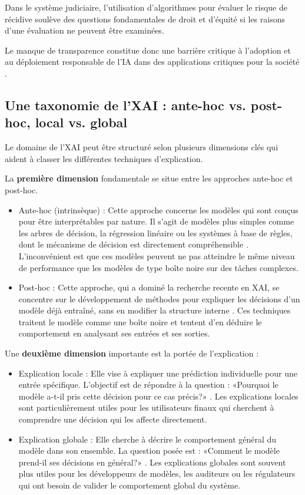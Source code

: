 Dans le système judiciaire, l'utilisation d'algorithmes pour évaluer le risque de récidive soulève des questions fondamentales de droit et d'équité si les raisons d'une évaluation ne peuvent être examinées. 

Le manque de transparence constitue donc une barrière critique à l'adoption et au déploiement responsable de l'IA dans des applications critiques pour la société \citep{Siganos2017, Solanke2022}.
\subsection{Une taxonomie de l'XAI : ante-hoc vs. post-hoc, local vs. global}
Le domaine de l'XAI peut être structuré selon plusieurs dimensions clés qui aident à classer les différentes techniques d'explication. 
\vspace{2em}

La \textbf{première dimension} fondamentale se situe entre les approches ante-hoc et post-hoc.

\begin{itemize}[label=\textbullet]
    \item Ante-hoc (intrinsèque) : Cette approche concerne les modèles qui sont conçus pour être interprétables par nature. Il s'agit de modèles plus simples comme les arbres de décision, la régression linéaire ou les systèmes à base de règles, dont le mécanisme de décision est directement compréhensible \citet{Rudin2019}. 
    L'inconvénient est que ces modèles peuvent ne pas atteindre le même niveau de performance que les modèles de type boîte noire sur des tâches complexes.
    \item Post-hoc : Cette approche, qui a dominé la recherche recente en XAI, se concentre sur le développement de méthodes pour expliquer les décisions d'un modèle déjà entraîné, sans en modifier la structure interne \citep{Sankarapu2024}. Ces techniques traitent le modèle comme une boîte noire et tentent d'en déduire le comportement en analysant ses entrées et ses sorties.
\end{itemize}

Une \textbf{deuxième dimension} importante est la portée de l'explication :
\begin{itemize}[label=\textbullet]
    \item Explication locale : Elle vise à expliquer une prédiction individuelle pour une entrée spécifique. L'objectif est de répondre à la question : «Pourquoi le modèle a-t-il pris cette décision pour ce cas précis?» \citep{Ribeiro2016, Sankarapu2024}. Les explications locales sont particulièrement utiles pour les utilisateurs finaux qui cherchent à comprendre une décision qui les affecte directement.
    \vspace{1em}
    \item Explication globale : Elle cherche à décrire le comportement général du modèle dans son ensemble. La question posée est : «Comment le modèle prend-il ses décisions en général?» \citet{Lundberg2017}. Les explications globales sont souvent plus utiles pour les développeurs de modèles, les auditeurs ou les régulateurs qui ont besoin de valider le comportement global du système.
\end{itemize}

